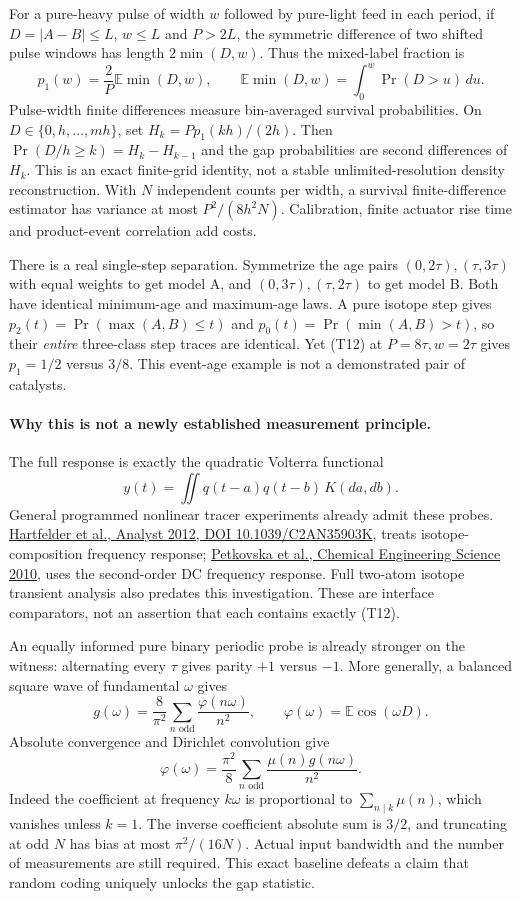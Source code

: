 \documentclass[11pt]{article}
\begin{document}
For a pure-heavy pulse of width $w$ followed by pure-light feed in each period, if $D=|A-B|\le L$, $w\le L$ and $P>2L$, the symmetric difference of two shifted pulse windows has length $2\min(D,w)$. Thus the mixed-label fraction is
\[
 p_1(w)=\frac2P\mathbb E\min(D,w),\qquad
 \mathbb E\min(D,w)=\int_0^w\Pr(D>u)\,du.
 \tag{T12}
\]
Pulse-width finite differences measure bin-averaged survival probabilities. On $D\in\{0,h,\ldots,mh\}$, set $H_k=Pp_1(kh)/(2h)$. Then $\Pr(D/h\ge k)=H_k-H_{k-1}$ and the gap probabilities are second differences of $H_k$. This is an exact finite-grid identity, not a stable unlimited-resolution density reconstruction. With $N$ independent counts per width, a survival finite-difference estimator has variance at most $P^2/(8h^2N)$. Calibration, finite actuator rise time and product-event correlation add costs.

There is a real single-step separation. Symmetrize the age pairs $(0,2\tau),(\tau,3\tau)$ with equal weights to get model A, and $(0,3\tau),(\tau,2\tau)$ to get model B. Both have identical minimum-age and maximum-age laws. A pure isotope step gives $p_2(t)=\Pr(\max(A,B)\le t)$ and $p_0(t)=\Pr(\min(A,B)>t)$, so their \emph{entire} three-class step traces are identical. Yet (T12) at $P=8\tau,w=2\tau$ gives $p_1=1/2$ versus $3/8$. This event-age example is not a demonstrated pair of catalysts.

\paragraph{Why this is not a newly established measurement principle.}
The full response is exactly the quadratic Volterra functional
\[
 y(t)=\iint q(t-a)q(t-b)\,K(da,db).
\]
General programmed nonlinear tracer experiments already admit these probes. \href{https://pubmed.ncbi.nlm.nih.gov/23034591/}{Hartfelder et al., Analyst 2012, DOI 10.1039/C2AN35903K}, treats isotope-composition frequency response; \href{https://doi.org/10.1016/j.ces.2010.03.011}{Petkovska et al., Chemical Engineering Science 2010}, uses the second-order DC frequency response. Full two-atom isotope transient analysis also predates this investigation. These are interface comparators, not an assertion that each contains exactly (T12).

An equally informed pure binary periodic probe is already stronger on the witness: alternating every $\tau$ gives parity $+1$ versus $-1$. More generally, a balanced square wave of fundamental $\omega$ gives
\[
 g(\omega)=\frac8{\pi^2}\sum_{n\text{ odd}}\frac{\varphi(n\omega)}{n^2},\qquad
 \varphi(\omega)=\mathbb E\cos(\omega D).
\]
Absolute convergence and Dirichlet convolution give
\[
 \varphi(\omega)=\frac{\pi^2}{8}
       \sum_{n\text{ odd}}\frac{\mu(n)g(n\omega)}{n^2}.
 \tag{T13}
\]
Indeed the coefficient at frequency $k\omega$ is proportional to $\sum_{n\mid k}\mu(n)$, which vanishes unless $k=1$. The inverse coefficient absolute sum is $3/2$, and truncating at odd $N$ has bias at most $\pi^2/(16N)$. Actual input bandwidth and the number of measurements are still required. This exact baseline defeats a claim that random coding uniquely unlocks the gap statistic.
\end{document}

